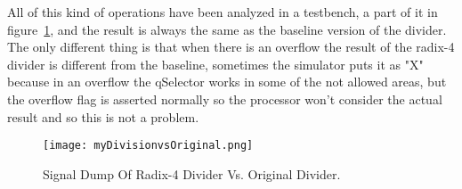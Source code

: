 All of this kind of operations have been analyzed in a testbench, a part of it in figure~\ref{fig:div32_wave}, and the result is always the same as the baseline version of the divider. The only different thing is that when there is an overflow the result of the radix-4 divider is different from the baseline, sometimes the simulator puts it as "X" because in an overflow the qSelector works in some of the not allowed areas, but the overflow flag is asserted normally so the processor won't consider the actual result and so this is not a problem.

\begin{figure}[H]
\centering
\texttt{[image: myDivisionvsOriginal.png]}
\caption{Signal Dump Of Radix-4 Divider Vs. Original Divider.}
\label{fig:div32_wave}
\end{figure}
